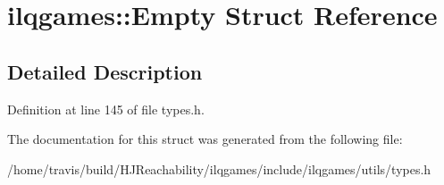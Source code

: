 \hypertarget{structilqgames_1_1_empty}{}\section{ilqgames\+:\+:Empty Struct Reference}
\label{structilqgames_1_1_empty}


\subsection{Detailed Description}


Definition at line 145 of file types.\+h.



The documentation for this struct was generated from the following file\+:\begin{DoxyCompactItemize}
\item 
/home/travis/build/\+H\+J\+Reachability/ilqgames/include/ilqgames/utils/types.\+h\end{DoxyCompactItemize}
